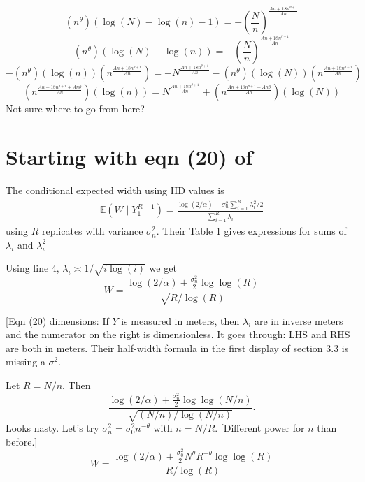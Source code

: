 \documentclass{article}
\newcommand{\art}[1]{\begingroup\color{blue}#1\endgroup}
\newcommand{\aadit}[1]{\begingroup\color{orange}#1\endgroup}
\newcommand{\e}{\mathbb{E}}
\begin{document}
\begin{equation}
(n^\theta) (\log(N) - \log(n) - 1) = -\left( \frac{N}{n} \right)^{\frac{A n + 18 n^{\theta + 1}}{A n}}
\end{equation}
\begin{equation}
(n^\theta) (\log(N) - \log(n)) = -\left( \frac{N}{n} \right)^{\frac{A n + 18 n^{\theta + 1}}{A n}}
\end{equation}
\begin{equation}
-(n^\theta) ( \log(n)) (n^{\frac{A n + 18 n^{\theta + 1}}{A n}}) = -N ^{\frac{A n + 18 n^{\theta + 1}}{A n}} - (n^\theta) ( \log(N)) (n^{\frac{A n + 18 n^{\theta + 1}}{A n}})
\end{equation}
\begin{equation}
(n^{\frac{A n + 18 n^{\theta + 1} + An\theta}{A n}}) ( \log(n))  = N ^{\frac{A n + 18 n^{\theta + 1}}{A n}} + (n^{\frac{A n + 18 n^{\theta + 1} + An\theta}{A n}}) ( \log(N))
\end{equation}
\aadit{Not sure where to go from here?}



\section*{Starting with eqn (20) of \cite{WauRam24a}}

The conditional expected width using IID values is
\begin{align}\label{eq:their20}
\e(W\mid Y_1^{R-1} )=\frac{\log(2/\alpha)+\sigma_n^2\sum_{i=1}^R\lambda_i^2/2}{\sum_{i=1}^R\lambda_i}
\end{align}
using $R$ replicates with variance $\sigma_n^2$.
Their Table 1 gives expressions for sums of $\lambda_i$
and $\lambda_i^2$

Using line 4, $\lambda_i\asymp 1/\sqrt{i\log(i)}$ we get
$$W=
\frac{\log(2/\alpha)+\frac{\sigma_n^2}2\log\log(R)}{\sqrt{R/\log(R)}}
$$

\art{[Eqn (20) dimensions: If $Y$ is measured in meters, then $\lambda_i$ are in inverse meters and the numerator on the right is dimensionless.  It goes through: LHS and RHS are both in meters.  Their half-width formula in the first display of section 3.3 is missing a $\sigma^2$.}

Let $R=N/n$.  Then
$$
\frac{\log(2/\alpha)+\frac{\sigma_n^2}2\log\log(N/n)}{\sqrt{(N/n)/\log(N/n)}}.
$$
Looks nasty.  Let's try $\sigma^2_n = \sigma^2_0n^{-\theta}$ with $n=N/R$.
\art{[Different power for $n$ than before.]}
$$W=
\frac{\log(2/\alpha)+\frac{\sigma_0^2}2N^\theta R^{-\theta}\log\log(R)}{R/\log(R)}
$$
\end{document}

